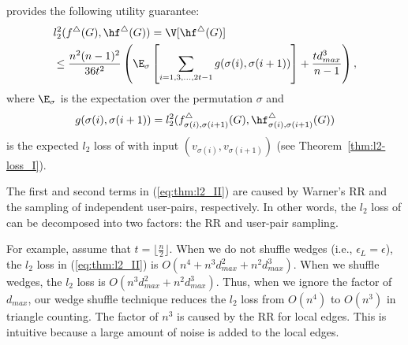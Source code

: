 \begin{theorem}
\label{thm:l2-loss_II}
\AlgWSTri{} provides the following utility guarantee:
\begin{align}
& l_2^2(f^\triangle(G), \hf^\triangle(G)) = \V[\hf^\triangle(G)] \nonumber\\ 
& \leq \frac{n^2(n-1)^2}{36t^2} \left(\E_\sigma \left[ \sum_{i=1, 3, \ldots, 2t-1} 
g(\sigma(i),\sigma(i+1)) \right] + \frac{t d_{max}^3}{n-1}\right), \label{eq:thm:l2_II}
\end{align}
where $\E_\sigma$ is the expectation over the permutation $\sigma$ and 
\begin{align}
g(\sigma(i),\sigma(i+1)) = l_2^2(f_{\sigma(i),\sigma(i+1)}^\triangle(G), \hf_{\sigma(i),\sigma(i+1)}^\triangle(G)) 
\label{eq:thm:g}
\end{align}
is the expected $l_2$ loss of \AlgWSLE{} with input $(v_{\sigma(i)},v_{\sigma(i+1)})$ (see Theorem~\ref{thm:l2-loss_I}). 
\end{theorem}

The first and second terms in (\ref{eq:thm:l2_II}) are caused by 
Warner's RR 
and the sampling of independent user-pairs, respectively. 
In other words, the $l_2$ loss of \AlgWSTri{} can be decomposed into two factors: the RR 
and user-pair sampling. 

For example, assume that $t = \lfloor \frac{n}{2} \rfloor$. 
When we do not shuffle wedges (i.e., $\epsilon_L = \epsilon$), the $l_2$ loss in (\ref{eq:thm:l2_II}) is $O(n^4 + n^3 d_{max}^2 + n^2 d_{max}^3)$. 
When we shuffle wedges, the $l_2$ loss is $O(n^3 d_{max}^2 + n^2 d_{max}^3)$. 
Thus, when we ignore the factor of $d_{max}$, our wedge shuffle technique reduces the $l_2$ loss from $O(n^4)$ to $O(n^3)$ in triangle counting. 
The factor of $n^3$ is caused by the RR for local edges. 
This is intuitive because a large amount of noise is added to the local edges. 

